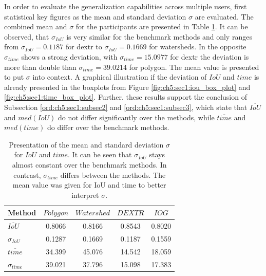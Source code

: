 In order to evaluate the generalization capabilities across multiple users, first statistical key figures as the mean and standard deviation $ \sigma $ are evaluated.
The combined mean and $ \sigma $ for the participants are presented in Table \ref{tab:ch5:all_benchmark_users_varaince}.
It can be observed, that $ \sigma_{IoU} $ is very similar for the benchmark methods and only ranges from $ \sigma_{IoU} = 0.1187 $ for \gls{dextr} to $ \sigma_{IoU} = 0.1669 $ for watersheds.
In the opposite $ \sigma_{time} $ shows a strong deviation, with $ \sigma_{time} = 15.0977 $ for \gls{dextr} the deviation is more than double than $ \sigma_{time} = 39.0214 $ for polygon.
The mean value is presented to put $ \sigma $ into context.
A graphical illustration if the deviation of $ IoU $ and $ time $ is already presented in the boxplots from Figure \ref{fig:ch5:sec1:iou_box_plot} and \ref{fig:ch5:sec1:time_box_plot}.
Further. these results support the conclusion of Subsection \ref{ord:ch5:sec1:subsec2} and \ref{ord:ch5:sec1:subsec3}, which state that $ \overline{IoU} $ and $ med(IoU) $ do not differ significantly over the methods, while $ \overline{time} $ and $ med(time) $ do differ over the benchmark methods.
\begin{table}[h!]
	\centering
	\begin{tabular}{l|c c c c}
		\toprule 		
		Method 				& $ Polygon $  	& $ Watershed $ 	& $ DEXTR $ 	& $ IOG $	\\
		\midrule
		$ \overline{IoU} $	& 0.8066 		& 0.8166		 	& 0.8543		& 0.8020	\\
		$ \sigma_{IoU} $	& 0.1287 		& 0.1669		 	& 0.1187 		& 0.1559	\\
		$ \overline{time} $	& 34.399 		& 45.076			& 14.542 		& 18.059	\\
		$ \sigma_{time} $	& 39.021 		& 37.796			& 15.098 		& 17.383	\\
		\bottomrule
	\end{tabular}
	\caption[Mean and standard deviation over benchmark methods]{
		Presentation of the mean and standard deviation $ \sigma $ for $ IoU $ and $ time $.
		It can be seen that $ \sigma_{IoU} $ stays almost constant over the benchmark methods.
		In contrast, $ \sigma_{time} $ differs between the methods.
		The mean value was given for IoU and time to better interpret $ \sigma $.
	}\label{tab:ch5:all_benchmark_users_varaince}	
\end{table}

